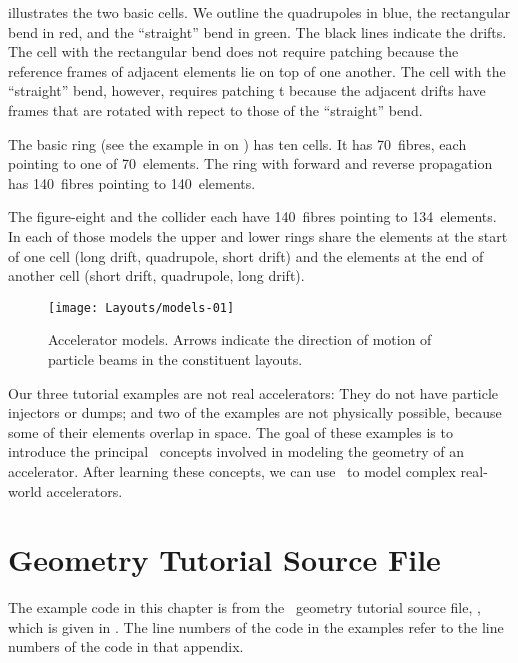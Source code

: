 illustrates the two basic cells. We outline
the quadrupoles in blue, the rectangular bend in red, and the
``straight'' bend in green. The black lines indicate the drifts.
The cell with the rectangular bend does not require patching  because the reference frames of
adjacent elements lie on top of one another. The cell with the
``straight'' bend, however, requires patching t because the adjacent drifts have frames that
are rotated with repect to those of the ``straight'' bend.

%
The basic ring (see the  example in 
on ) has ten cells. It has 70~fibres, each pointing
to one of 70~elements. The ring with forward and reverse propagation has
140~fibres pointing to 140~elements.

The figure-eight and the collider each have 140~fibres pointing to
134~elements. In each of those models the upper and lower rings share
the elements at the start of one cell (long drift, quadrupole, short
drift) and the elements at the end of another cell (short drift,
quadrupole, long drift).

\begin{figure}[ht]
  \centering
  \texttt{[image: Layouts/models-01]}
  \caption{Accelerator models. Arrows indicate the direction of motion
           of particle beams in the constituent layouts.}
  \label{fig:accel.models}
\end{figure}

Our three tutorial examples are not real accelerators: They do not
have particle injectors or dumps; and two of the examples are not
physically possible, because some of their elements overlap in space.
The goal of these examples is to introduce the principal \PTC\ concepts
involved in modeling the geometry of an accelerator. After learning
these concepts, we can use \PTC\ to model complex real-world
accelerators.


\section{Geometry Tutorial Source File}
\label{sec:geom.tut}

%
The example code in this chapter is from the \PTC\ geometry tutorial
source file, , which is given in
. The line numbers of the code in the examples
refer to the line numbers of the code in that appendix.


